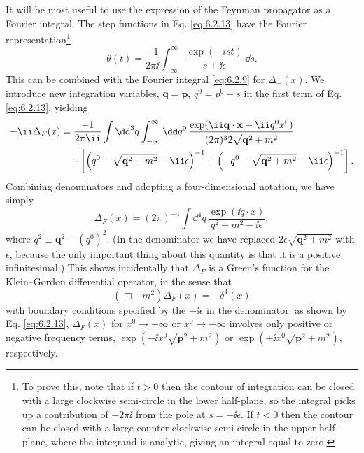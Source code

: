 It will be most useful to use the expression of the Feynman propagator as a
Fourier integral. The step functions in Eq. \eqref{eq:6.2.13} have the Fourier
representation\footnote{To prove this, note that if $t>0$ then the contour of
integration can be closed with a large clockwise semi-circle in the lower
half-plane, so the integral picks up a contribution of $-2\pi \ii$ from the pole
at $s=-\ii\epsilon$. If $t<0$ then the contour can be closed with a large
counter-clockwise semi-circle in the upper half-plane, where the integrand is
analytic, giving an integral equal to zero.}
\begin{equation}
\theta(t)=\frac{-1}{2\pi \ii}\int_{-\infty}^{\infty}
 \frac{\exp(-ist)}{s+\ii\epsilon}\,\dd s.
\tag{6.2.15}
\label{eq:6.2.15}
\end{equation}
This can be combined with the Fourier integral \eqref{eq:6.2.9} for $\Delta_+(x)$. We
introduce new integration variables, $\mathbf q=\mathbf p$,
$q^0=p^0+s$ in the first term of Eq. \eqref{eq:6.2.13}, yielding
\begin{align*}
-\ii\Delta_F(x)={}&\frac{-1}{2\pi \ii}\int \dd^3q
 \int_{-\infty}^{\infty}\dd q^0\,
 \frac{\exp(\ii\mathbf q\cdot\mathbf x-\ii q^0x^0)}
 {(2\pi)^3 2\sqrt{\mathbf q^2+m^2}}
\notag\\
&\cdot\left[
 \left(q^0-\sqrt{\mathbf q^2+m^2}-\ii\epsilon\right)^{-1}
 +\left(-q^0-\sqrt{\mathbf q^2+m^2}-\ii\epsilon\right)^{-1}
 \right].
\end{align*}
Combining denominators and adopting a four-dimensional notation, we have
simply
\begin{equation}
\Delta_F(x)=(2\pi)^{-4}\int \dd^4q\,
 \frac{\exp(\ii q\cdot x)}{q^2+m^2-\ii\epsilon},
\tag{6.2.16}
\label{eq:6.2.16}
\end{equation}
where $q^2\equiv\mathbf q^2-(q^0)^2$. (In the denominator we have replaced
$2\epsilon\sqrt{\mathbf q^2+m^2}$ with $\epsilon$, because the only important
thing about this quantity is that it is a positive infinitesimal.) This shows
incidentally that $\Delta_F$ is a Green's function for the Klein--Gordon
differential operator, in the sense that
\begin{equation}
(\Box-m^2)\Delta_F(x)=-\delta^4(x)
\tag{6.2.17}
\label{eq:6.2.17}
\end{equation}
with boundary conditions specified by the $-\ii\epsilon$ in the denominator: as
shown by Eq. \eqref{eq:6.2.13}, $\Delta_F(x)$ for $x^0\to+\infty$ or
$x^0\to-\infty$ involves only positive or negative frequency terms,
$\exp(-\ii x^0\sqrt{\mathbf p^2+m^2})$ or
$\exp(+\ii x^0\sqrt{\mathbf p^2+m^2})$, respectively.

